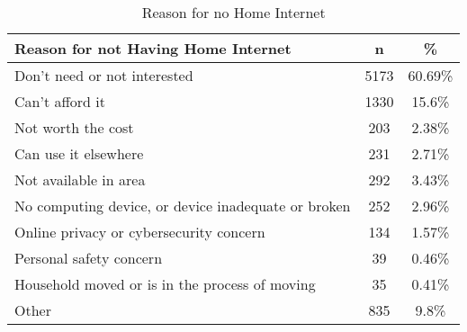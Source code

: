 \documentclass{article}
\begin{document}
\begin{table}[ht]
\centering
\begin{tabular}{lcc}
  \hline
  Reason for not Having Home Internet & n & \% \\ 
  \hline
  Don't need or not interested & 5173 & 60.69\% \\ 
  Can't afford it & 1330 & 15.6\% \\ 
  Not worth the cost & 203 & 2.38\% \\ 
  Can use it elsewhere & 231 & 2.71\% \\ 
  Not available in area & 292 & 3.43\% \\ 
  No computing device, or device inadequate or broken & 252 & 2.96\% \\ 
  Online privacy or cybersecurity concern & 134 & 1.57\% \\ 
  Personal safety concern &  39 & 0.46\% \\ 
  Household moved or is in the process of moving &  35 & 0.41\% \\
  Other & 835 & 9.8\% \\ 
   \hline
\end{tabular}
\caption*{Reason for no Home Internet} 
\end{table}
\end{document}

